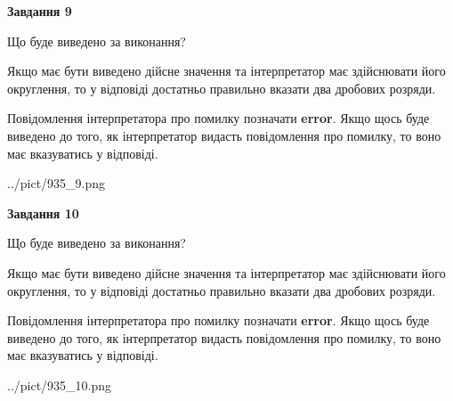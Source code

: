 \documentclass[12pt, ukrainian]{article}
\begin{document}
{\begin {Large}
{\begin {center}\textbf{Завдання 9}\end {center}}\par
Що буде виведено за виконання? \par

Якщо має бути виведено дійсне значення та інтерпретатор має здійснювати його округлення, 
то у відповіді достатньо правильно вказати два дробових розряди.

Повідомлення інтерпретатора про помилку позначати \textbf{error}.
Якщо щось буде виведено до того, як інтерпретатор видасть повідомлення про помилку, 
то воно має вказуватись у відповіді. \par

\begin{center}
	{../pict/935_9.png}
\end{center}
\newpage

{\begin {center}\textbf{Завдання 10}\end {center}}\par
Що буде виведено за виконання? \par

Якщо має бути виведено дійсне значення та інтерпретатор має здійснювати його округлення, 
то у відповіді достатньо правильно вказати два дробових розряди.

Повідомлення інтерпретатора про помилку позначати \textbf{error}.
Якщо щось буде виведено до того, як інтерпретатор видасть повідомлення про помилку, 
то воно має вказуватись у відповіді. \par

\begin{center}
	{../pict/935_10.png}
\end{center}
\newpage

\end {Large}}
\end{document}

